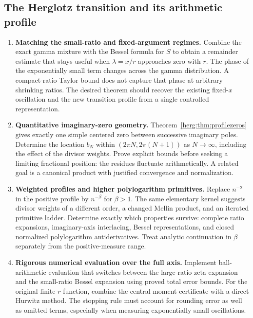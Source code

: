 \subsection{The Herglotz transition and its arithmetic profile}
\begin{enumerate}[label=H\arabic*.,leftmargin=*]
\item \textbf{Matching the small-ratio and fixed-argument regimes.}
Combine the exact gamma mixture with the Bessel formula for $S$ to
obtain a remainder estimate that stays useful when $\lambda=x/r$
approaches zero with $r$. The phase of the exponentially small term
changes across the gamma distribution. A compact-ratio Taylor bound
does not capture that phase at arbitrary shrinking ratios. The desired
theorem should recover the existing fixed-$x$ oscillation and the
new transition profile from a single controlled representation.

\item \textbf{Quantitative imaginary-zero geometry.}
Theorem~\ref{herg:thm:profilezeros} gives exactly one simple centered zero
between successive imaginary poles. Determine the location $b_N$
within $(2\pi N,2\pi(N+1))$ as $N\to\infty$, including the effect of
the divisor weights. Prove explicit bounds before seeking a limiting
fractional position: the residues fluctuate arithmetically. A related
goal is a canonical product with justified convergence and normalization.

\item \textbf{Weighted profiles and higher polylogarithm primitives.}
Replace $n^{-2}$ in the positive profile by $n^{-\beta}$ for $\beta>1$.
The same elementary kernel suggests divisor weights of a different
order, a changed Mellin product, and an iterated primitive ladder.
Determine exactly which properties survive: complete ratio expansions,
imaginary-axis interlacing, Bessel representations, and closed normalized
polylogarithm antiderivatives. Treat analytic continuation in $\beta$
separately from the positive-measure range.

\item \textbf{Rigorous numerical evaluation over the full axis.}
Implement ball-arithmetic evaluation that switches between the
large-ratio zeta expansion and the small-ratio Bessel expansion using
proved total error bounds. For the original finite-$r$ function,
combine the central-moment certificate with a direct Hurwitz method.
The stopping rule must account for rounding error as well as omitted
terms, especially when measuring exponentially small oscillations.
\end{enumerate}

